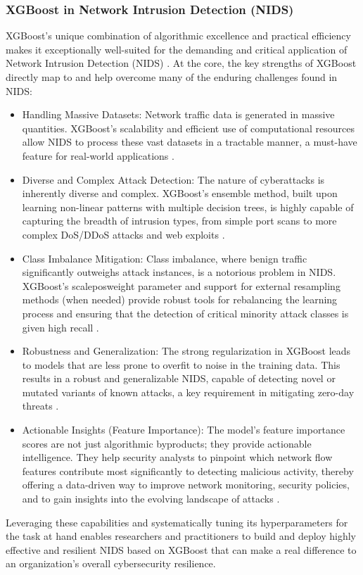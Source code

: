 \subsubsection{XGBoost in Network Intrusion Detection (NIDS)} 
XGBoost's unique combination of algorithmic excellence and practical efficiency makes it exceptionally well-suited for the demanding and critical application of Network Intrusion Detection (NIDS) \parencite{aldhubaib2024network}. At the core, the key strengths of XGBoost directly map to and help overcome many of the enduring challenges found in NIDS:
\begin{itemize}[noitemsep] 
\item Handling Massive Datasets: Network traffic data is generated in massive quantities. XGBoost's scalability and efficient use of computational resources allow NIDS to process these vast datasets in a tractable manner, a must-have feature for real-world applications \parencite{almutairi2025intrusion}.
\item Diverse and Complex Attack Detection: The nature of cyberattacks is inherently diverse and complex. XGBoost's ensemble method, built upon learning non-linear patterns with multiple decision trees, is highly capable of capturing the breadth of intrusion types, from simple port scans to more complex DoS/DDoS attacks and web exploits \parencite{habeeb2024two}.
\item Class Imbalance Mitigation: Class imbalance, where benign traffic significantly outweighs attack instances, is a notorious problem in NIDS. XGBoost's scale\textunderscore pos\textunderscore weight parameter and support for external resampling methods (when needed) provide robust tools for rebalancing the learning process and ensuring that the detection of critical minority attack classes is given high recall \parencite{mahfouz2022systematic}.
\item Robustness and Generalization: The strong regularization in XGBoost leads to models that are less prone to overfit to noise in the training data. This results in a robust and generalizable NIDS, capable of detecting novel or mutated variants of known attacks, a key requirement in mitigating zero-day threats \parencite{agrawal2021survey}.
\item Actionable Insights (Feature Importance): The model's feature importance scores are not just algorithmic byproducts; they provide actionable intelligence. They help security analysts to pinpoint which network flow features contribute most significantly to detecting malicious activity, thereby offering a data-driven way to improve network monitoring, security policies, and to gain insights into the evolving landscape of attacks \parencite{kasongo2021improving}.
\end{itemize} 
Leveraging these capabilities and systematically tuning its hyperparameters for the task at hand enables researchers and practitioners to build and deploy highly effective and resilient NIDS based on XGBoost that can make a real difference to an organization's overall cybersecurity resilience.



